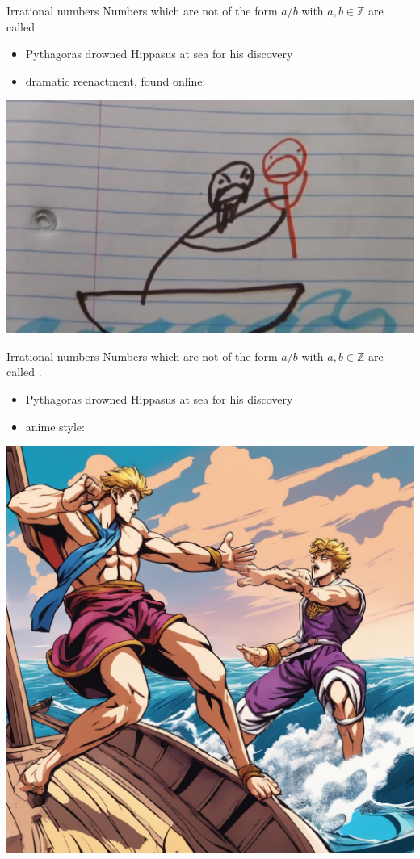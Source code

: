 \documentclass{beamer}
\begin{document}
\begin{frame}{Irrational numbers}
Numbers which are not of the form $a/b$ with $a,b\in\mathbb{Z}$ are called .\\
\begin{itemize}
\item Pythagoras drowned Hippasus at sea for his discovery
\pause
\item dramatic reenactment, found online:
\pause
\end{itemize}
\pause
\begin{center}
\includegraphics[width=0.6\linewidth]{fig/hippasus-death}
\end{center}
\end{frame}

\begin{frame}{Irrational numbers}
Numbers which are not of the form $a/b$ with $a,b\in\mathbb{Z}$ are called .\\
\begin{itemize}
\item Pythagoras drowned Hippasus at sea for his discovery
\item anime style:
\pause
\end{itemize}
\begin{center}
\includegraphics[width=0.4\linewidth]{fig/jojo-hippasus}
\end{center}
\end{frame}
\end{document}
